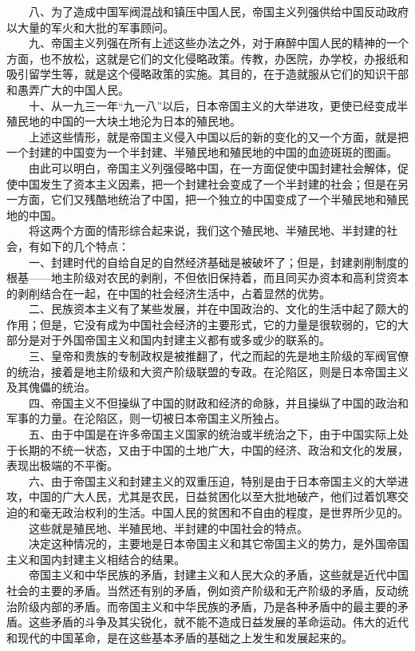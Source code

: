 \documentclass[cn,11pt,chinese]{elegantbook}
\begin{document}
　　八、为了造成中国军阀混战和镇压中国人民，帝国主义列强供给中国反动政府以大量的军火和大批的军事顾问。\\
　　九、帝国主义列强在所有上述这些办法之外，对于麻醉中国人民的精神的一个方面，也不放松，这就是它们的文化侵略政策。传教，办医院，办学校，办报纸和吸引留学生等，就是这个侵略政策的实施。其目的，在于造就服从它们的知识干部和愚弄广大的中国人民。\\
　　十、从一九三一年“九一八”以后，日本帝国主义的大举进攻，更使已经变成半殖民地的中国的一大块土地沦为日本的殖民地。\\
　　上述这些情形，就是帝国主义侵入中国以后的新的变化的又一个方面，就是把一个封建的中国变为一个半封建、半殖民地和殖民地的中国的血迹斑斑的图画。\\
　　由此可以明白，帝国主义列强侵略中国，在一方面促使中国封建社会解体，促使中国发生了资本主义因素，把一个封建社会变成了一个半封建的社会；但是在另一方面，它们又残酷地统治了中国，把一个独立的中国变成了一个半殖民地和殖民地的中国。\\
　　将这两个方面的情形综合起来说，我们这个殖民地、半殖民地、半封建的社会，有如下的几个特点：\\
　　一、封建时代的自给自足的自然经济基础是被破坏了；但是，封建剥削制度的根基——地主阶级对农民的剥削，不但依旧保持着，而且同买办资本和高利贷资本的剥削结合在一起，在中国的社会经济生活中，占着显然的优势。\\
　　二、民族资本主义有了某些发展，并在中国政治的、文化的生活中起了颇大的作用；但是，它没有成为中国社会经济的主要形式，它的力量是很软弱的，它的大部分是对于外国帝国主义和国内封建主义都有或多或少的联系的。\\
　　三、皇帝和贵族的专制政权是被推翻了，代之而起的先是地主阶级的军阀官僚的统治，接着是地主阶级和大资产阶级联盟的专政。在沦陷区，则是日本帝国主义及其傀儡的统治。\\
　　四、帝国主义不但操纵了中国的财政和经济的命脉，并且操纵了中国的政治和军事的力量。在沦陷区，则一切被日本帝国主义所独占。\\
　　五、由于中国是在许多帝国主义国家的统治或半统治之下，由于中国实际上处于长期的不统一状态，又由于中国的土地广大，中国的经济、政治和文化的发展，表现出极端的不平衡。\\
　　六、由于帝国主义和封建主义的双重压迫，特别是由于日本帝国主义的大举进攻，中国的广大人民，尤其是农民，日益贫困化以至大批地破产，他们过着饥寒交迫的和毫无政治权利的生活。中国人民的贫困和不自由的程度，是世界所少见的。\\
　　这些就是殖民地、半殖民地、半封建的中国社会的特点。\\
　　决定这种情况的，主要地是日本帝国主义和其它帝国主义的势力，是外国帝国主义和国内封建主义相结合的结果。\\
　　帝国主义和中华民族的矛盾，封建主义和人民大众的矛盾，这些就是近代中国社会的主要的矛盾。当然还有别的矛盾，例如资产阶级和无产阶级的矛盾，反动统治阶级内部的矛盾。而帝国主义和中华民族的矛盾，乃是各种矛盾中的最主要的矛盾。这些矛盾的斗争及其尖锐化，就不能不造成日益发展的革命运动。伟大的近代和现代的中国革命，是在这些基本矛盾的基础之上发生和发展起来的。\\
\end{document}
